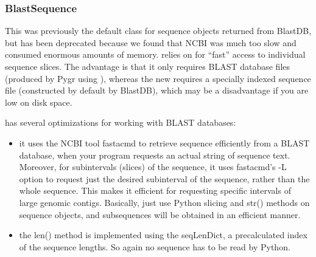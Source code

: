 \documentclass{howto}
\begin{document}
\subsubsection{BlastSequence}

This was previously the default class for sequence objects returned from BlastDB,
but has been deprecated because we found that NCBI  was much too slow
and consumed enormous amounts of memory.   relies on
 for ``fast'' access to individual sequence slices.  The advantage is
that it only requires BLAST database files (produced by Pygr using ),
whereas the new  requires a specially indexed sequence file
(constructed by default by BlastDB), which may be a disadvantage if you are low
on disk space.

 has several optimizations for working with BLAST databases:

\begin{itemize}
\item
it uses the NCBI tool fastacmd to retrieve sequence efficiently from a BLAST database, when your program requests an actual string of sequence text.  Moreover, for subintervals (slices) of the sequence, it uses fastacmd's -L option to request just the desired subinterval of the sequence, rather than the whole sequence.  This makes it efficient for requesting specific intervals of large genomic contigs.  Basically, just use Python slicing and str() methods on sequence objects, and subsequences will be obtained in an efficient manner.

\item 
the len() method is implemented using the seqLenDict, a precalculated index of the sequence lengths.  So again no sequence has to be read by Python.

\end{itemize}
\end{document}
